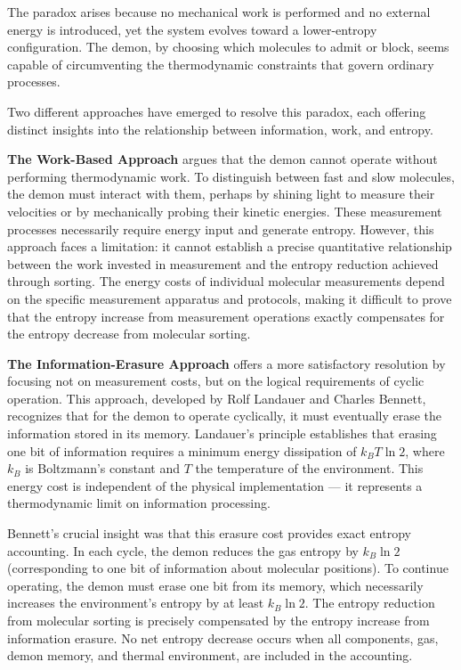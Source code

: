 The paradox arises because no mechanical work is performed and no external energy is introduced, yet the system evolves toward a lower-entropy configuration. The demon, by choosing which molecules to admit or block, seems capable of circumventing the thermodynamic constraints that govern ordinary processes.

Two different approaches have emerged to resolve this paradox, each offering distinct insights into the relationship between information, work, and entropy.

\textbf{The Work-Based Approach} argues that the demon cannot operate without performing thermodynamic work. To distinguish between fast and slow molecules, the demon must interact with them, perhaps by shining light to measure their velocities or by mechanically probing their kinetic energies. These measurement processes necessarily require energy input and generate entropy. However, this approach faces a limitation: it cannot establish a precise quantitative relationship between the work invested in measurement and the entropy reduction achieved through sorting. The energy costs of individual molecular measurements depend on the specific measurement apparatus and protocols, making it difficult to prove that the entropy increase from measurement operations exactly compensates for the entropy decrease from molecular sorting.

\textbf{The Information-Erasure Approach} offers a more satisfactory resolution by focusing not on measurement costs, but on the logical requirements of cyclic operation. This approach, developed by Rolf Landauer and Charles Bennett, recognizes that for the demon to operate cyclically, it must eventually erase the information stored in its memory. Landauer's principle establishes that erasing one bit of information requires a minimum energy dissipation of $k_B T \ln 2$, where $k_B$ is Boltzmann's constant and $T$ the temperature of the environment. This energy cost is independent of the physical implementation — it represents a thermodynamic limit on information processing.

Bennett's crucial insight was that this erasure cost provides exact entropy accounting. In each cycle, the demon reduces the gas entropy by $k_B \ln 2$ (corresponding to one bit of information about molecular positions). To continue operating, the demon must erase one bit from its memory, which necessarily increases the environment's entropy by at least $k_B \ln 2$. The entropy reduction from molecular sorting is precisely compensated by the entropy increase from information erasure. No net entropy decrease occurs when all components, gas, demon memory, and thermal environment, are included in the accounting.


